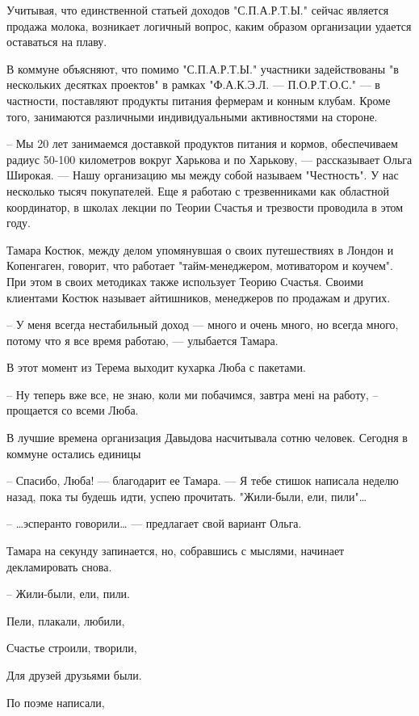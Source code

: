 \documentclass[a4paper,11pt]{extreport}
\begin{document}
Учитывая, что единственной статьей доходов "С.П.А.Р.Т.Ы." сейчас является
продажа молока, возникает логичный вопрос, каким образом организации удается
оставаться на плаву. 

В коммуне объясняют, что помимо "С.П.А.Р.Т.Ы." участники задействованы "в
нескольких десятках проектов" в рамках "Ф.А.К.Э.Л. --- П.О.Р.Т.О.С." --- в
частности, поставляют продукты питания фермерам и конным клубам. Кроме того,
занимаются различными индивидуальными активностями на стороне.

– Мы 20 лет занимаемся доставкой продуктов питания и кормов, обеспечиваем
радиус 50-100 километров вокруг Харькова и по Харькову, --- рассказывает Ольга
Широкая. --- Нашу организацию мы между собой называем "Честность". У нас
несколько тысяч покупателей. Еще я работаю с трезвенниками как областной
координатор, в школах лекции по Теории Счастья и трезвости проводила в этом
году.

Тамара Костюк, между делом упомянувшая о своих путешествиях в Лондон и
Копенгаген, говорит, что работает "тайм-менеджером, мотиватором и коучем". При
этом в своих методиках также использует Теорию Счастья. Своими клиентами Костюк
называет айтишников, менеджеров по продажам и других.

– У меня всегда нестабильный доход --- много и очень много, но всегда много,
потому что я все время работаю, --- улыбается Тамара.

В этот момент из Терема выходит кухарка Люба с пакетами.

– Ну теперь вже все, не знаю, коли ми побачимся, завтра мені на работу, –
прощается со всеми Люба.



В лучшие времена организация Давыдова насчитывала сотню человек. Сегодня в коммуне остались единицы

– Спасибо, Люба! --- благодарит ее Тамара. --- Я тебе стишок написала неделю назад, пока ты будешь идти, успею прочитать. "Жили-были, ели, пили"…

– …эсперанто говорили… --- предлагает свой вариант Ольга.

Тамара на секунду запинается, но, собравшись с мыслями, начинает декламировать снова.

– Жили-были, ели, пили.

Пели, плакали, любили,

Счастье строили, творили,

Для друзей друзьями были.

По поэме написали,
\end{document}
